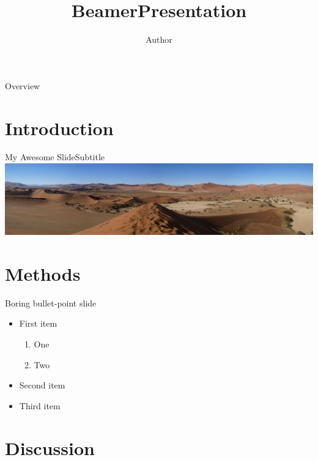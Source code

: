 \documentclass[11pt]{beamer}
\author{Author}
\title{BeamerPresentation}
\institute{University of Calgary}
\begin{document}
\begin{frame}
\titlepage
\end{frame}

\begin{frame}{Overview}
\tableofcontents
\end{frame}

\section{Introduction}

\begin{frame}{My Awesome Slide}{Subtitle}
\includegraphics[width=\textwidth]{wide.jpg}
\end{frame}

\section{Methods}

\begin{frame}{Boring bullet-point slide}
\begin{itemize}
	\item First item
		\begin{enumerate}
			\item One
			\item Two
		\end{enumerate}
	\item Second item 
	\item Third item
\end{itemize}
\end{frame}

\section{Discussion}

\begin{frame}
\end{frame}
\end{document}
